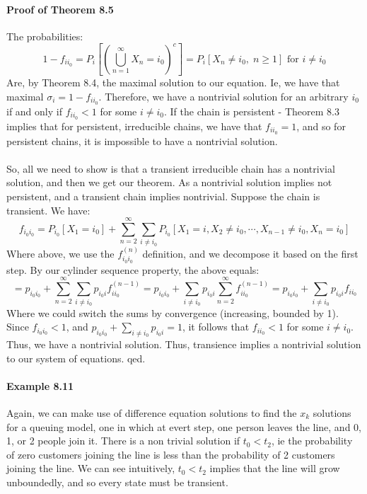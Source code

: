 \documentclass[12pt,a4paper]{article}
\newcommand{\1}[1]{\mathbbm{1}\left\{ #1 \right\}}
\begin{document}
\paragraph{Proof of Theorem 8.5} The probabilities:
$$
	1 - f_{ii_0} = P_i\left[\left(\bigcup_{n = 1}^\infty X_n = i_0\right)^c\right] =
	P_i\left[X_n \neq i_0, \; n \geq 1\right] \text{ for $i \neq i_0$}
$$
Are, by Theorem 8.4, the maximal solution to our equation. Ie, we have that maximal $\sigma_i = 1 - f_{ii_0}$. Therefore, we have a nontrivial solution for an arbitrary $i_0$ if and only if $f_{ii_0} < 1$ for some $i \neq i_0$. If the chain is persistent - Theorem 8.3 implies that for persistent, irreducible chains, we have that $f_{ii_0} = 1$, and so for persistent chains, it is impossible to have a nontrivial solution.
\\\\
So, all we need to show is that a transient irreducible chain has a nontrivial solution, and then we get our theorem. As a nontrivial solution implies not persistent, and a transient chain implies nontrivial. Suppose the chain is transient. We have:
$$
	f_{i_0i_0} = P_{i_0}\left[X_1 = i_0\right] +
	\sum_{n=2}^\infty \sum_{i \neq i_0} P_{i_0}\left[X_1 = i, X_2 \neq i_0, \cdots, X_{n-1} \neq i_0, X_n = i_0\right]
$$
Where above, we use the $f_{i_0i_0}^{(n)}$ definition, and we decompose it based on the first step. By our cylinder sequence property, the above equals:
$$
	= p_{i_0i_0} + \sum_{n=2}^\infty \sum_{i \neq i_0} p_{i_0i} f_{ii_0}^{(n - 1)}
	= p_{i_0i_0} + \sum_{i \neq i_0} p_{i_0i} \sum_{n=2}^\infty f_{ii_0}^{(n - 1)}
	= p_{i_0i_0} + \sum_{i \neq i_0} p_{i_0i} f_{ii_0}
$$
Where we could switch the sums by convergence (increasing, bounded by 1). Since $f_{i_0i_0} < 1$, and $p_{i_0i_0} + \sum_{i \neq i_0} p_{i_0i} = 1$, it follows that $f_{ii_0} < 1$ for some $i \neq i_0$. Thus, we have a nontrivial solution. Thus, transience implies a nontrivial solution to our system of equations. qed.

\paragraph{Example 8.11} Again, we can make use of difference equation solutions to find the $x_k$ solutions for a queuing model, one in which at evert step, one person leaves the line, and 0, 1, or 2 people join it. There is a non trivial solution if $t_0 < t_2$, ie the probability of zero customers joining the line is less than the probability of 2 customers joining the line. We can see intuitively, $t_0 < t_2$ implies that the line will grow unboundedly, and so every state must be transient.
\end{document}
